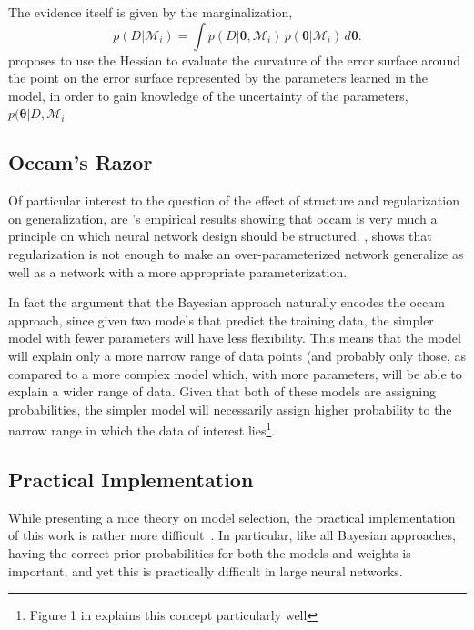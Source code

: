\documentclass[thesis]{subfiles}
\begin{document}
The evidence itself is given by the marginalization,
\begin{equation}
	p(D|\mathcal{M}_i) = \int p(D|\mathbf{\theta},\mathcal{M}_i)\,p(\mathbf{\theta}|\mathcal{M}_i)\,d\mathbf{\theta}.
\end{equation}
 proposes to use the Hessian to evaluate the curvature of the error surface around the point on the error surface represented by the parameters learned in the model, in order to gain knowledge of the uncertainty of the parameters, \ie{}$p(\mathbf{\theta}|D,\mathcal{M}_i$

\subsection{Occam's Razor}
Of particular interest to the question of the effect of structure and regularization on generalization, are \citeauthor{MacKay91}'s empirical results showing that \gls{occam} is very much a principle on which neural network design should be structured. \citet[]{MacKay91}, shows that regularization is not enough to make an over-parameterized network generalize as well as a network with a more appropriate parameterization.

In fact \citeauthor{mackay1992practical} the argument that the Bayesian approach naturally encodes the \gls{occam} approach, since given two models that predict the training data, the simpler model with fewer parameters will have less flexibility. This means that the model will explain only a more narrow range of data points (and probably only those, as compared to a more complex model which, with more parameters, will be able to explain a wider range of data. Given that both of these models are assigning probabilities, the simpler model will necessarily assign higher probability to the narrow range in which the data of interest lies\footnote{Figure 1 in \citet{mackay1995} explains this concept particularly well}.

\subsection{Practical Implementation}
While presenting a nice theory on model selection, the practical implementation of this work is rather more difficult~\citep{chipman2001}. In particular, like all Bayesian approaches, having the correct prior probabilities for both the models and weights is important, and yet this is practically difficult in large neural networks.
\end{document}
